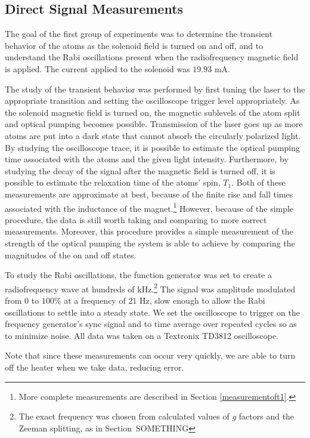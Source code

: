 \subsection{Direct Signal Measurements}\label{directsignalmeasurements}

The goal of the first group of experiments was to determine the transient behavior of the atoms as the solenoid field is turned on and off, and to understand the Rabi oscillations present when the radiofrequency magnetic field is applied. The current applied to the solenoid was $19.93$ mA.

The study of the transient behavior was performed by first tuning the laser to the appropriate transition and setting the oscilloscope trigger level appropriately. As the solenoid magnetic field is turned on, the magnetic sublevels of the atom split and optical pumping becomes possible. Transmission of the laser goes up as more atoms are put into a dark state that cannot absorb the circularly polarized light. By studying the oscilloscope trace, it is possible to estimate the optical pumping time associated with the atoms and the given light intensity. Furthermore, by studying the decay of the signal after the magnetic field is turned off, it is possible to estimate the relaxation time of the atoms' spin, $T_{1}$. Both of these measurements are approximate at best, because of the finite rise and fall times associated with the inductance of the magnet.\footnote{More complete measurements are described in Section \ref{measurementoft1}.} However, because of the simple procedure, the data is still worth taking and comparing to more correct measurements. Moreover, this procedure provides a simple measurement of the strength of the optical pumping the system is able to achieve by comparing the magnitudes of the on and off states.

To study the Rabi oscillations, the function generator was set to create a radiofrequency wave at hundreds of kHz.\footnote{The exact frequency was chosen from calculated values of $g$ factors and the Zeeman splitting, as in Section~SOMETHING} The signal was amplitude modulated from $0$ to $100\%$ at a frequency of $21$ Hz, slow enough to allow the Rabi oscillations to settle into a steady state. We set the oscilloscope to trigger on the frequency generator's sync signal and to time average over repeated cycles so as to minimize noise. All data was taken on a Textronix TD3812 oscilloscope.

Note that since these measurements can occur very quickly, we are able to turn off the heater when we take data, reducing error.

